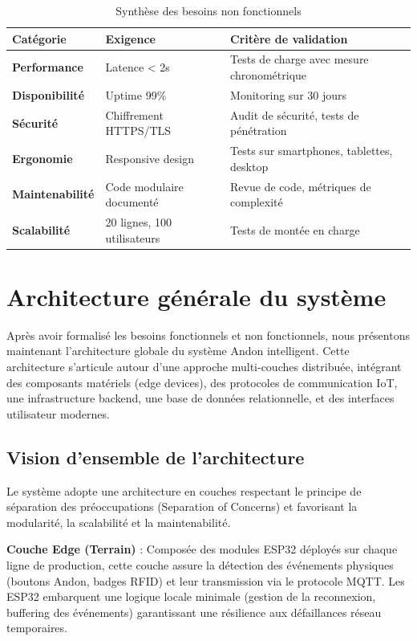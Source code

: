 \begin{table}[htbp]
\centering
\small
\caption{Synthèse des besoins non fonctionnels}
\label{tab:bnf_synthesis}
\begin{tabular}{|p{3cm}|p{5cm}|p{5cm}|}
\hline
\rowcolor{sewesblu!20}
\textbf{Catégorie} & \textbf{Exigence} & \textbf{Critère de validation} \\
\hline
\textbf{Performance} & Latence < 2s & Tests de charge avec mesure chronométrique \\
\hline
\textbf{Disponibilité} & Uptime 99\% & Monitoring sur 30 jours \\
\hline
\textbf{Sécurité} & Chiffrement HTTPS/TLS & Audit de sécurité, tests de pénétration \\
\hline
\textbf{Ergonomie} & Responsive design & Tests sur smartphones, tablettes, desktop \\
\hline
\textbf{Maintenabilité} & Code modulaire documenté & Revue de code, métriques de complexité \\
\hline
\textbf{Scalabilité} & 20 lignes, 100 utilisateurs & Tests de montée en charge \\
\hline
\end{tabular}
\end{table}


\section{Architecture générale du système}

Après avoir formalisé les besoins fonctionnels et non fonctionnels, nous présentons maintenant l'architecture globale du système Andon intelligent. Cette architecture s'articule autour d'une approche multi-couches distribuée, intégrant des composants matériels (edge devices), des protocoles de communication IoT, une infrastructure backend, une base de données relationnelle, et des interfaces utilisateur modernes.

\subsection{Vision d'ensemble de l'architecture}

Le système adopte une architecture en couches respectant le principe de séparation des préoccupations (Separation of Concerns) et favorisant la modularité, la scalabilité et la maintenabilité.

\textbf{Couche Edge (Terrain)} : Composée des modules ESP32 déployés sur chaque ligne de production, cette couche assure la détection des événements physiques (boutons Andon, badges RFID) et leur transmission via le protocole MQTT. Les ESP32 embarquent une logique locale minimale (gestion de la reconnexion, buffering des événements) garantissant une résilience aux défaillances réseau temporaires.

